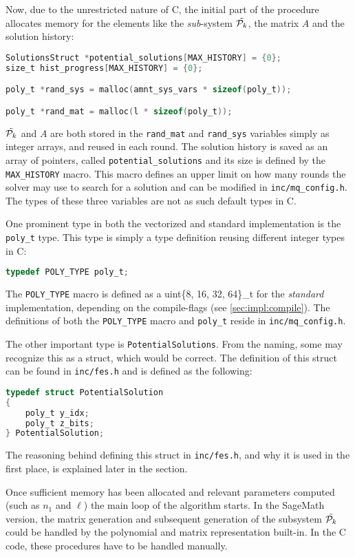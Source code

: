 Now, due to the unrestricted nature of C, the initial part of the procedure allocates memory for the elements like the \textit{sub}-system $\Tilde{\mathcal{P}_k}$, the matrix $A$ and the solution history:
\begin{lstlisting}[language=C,style=mystyle]
SolutionsStruct *potential_solutions[MAX_HISTORY] = {0};
size_t hist_progress[MAX_HISTORY] = {0};

poly_t *rand_sys = malloc(amnt_sys_vars * sizeof(poly_t));

poly_t *rand_mat = malloc(l * sizeof(poly_t));    
\end{lstlisting}
$\Tilde{\mathcal{P}_k}$ and $A$ are both stored in the \texttt{rand\_mat} and \texttt{rand\_sys} variables simply as integer arrays, and reused in each round. The solution history is saved as an array of pointers, called \texttt{potential\_solutions} and its size is defined by the \texttt{MAX\_HISTORY} macro. This macro defines an upper limit on how many rounds the solver may use to search for a solution and can be modified in \texttt{inc/mq\_config.h}. The types of these three variables are not as such default types in C.

One prominent type in both the vectorized and standard implementation is the \texttt{poly\_t} type. This type is simply a type definition reusing different integer types in C:
\begin{lstlisting}[language=C,style=mystyle]
typedef POLY_TYPE poly_t;
\end{lstlisting}
The \texttt{POLY\_TYPE} macro is defined as a uint\{8, 16, 32, 64\}\_t for the \textit{standard} implementation, depending on the compile-flags (see \cref{sec:impl:compile}). The definitions of both the \texttt{POLY\_TYPE} macro and \texttt{poly\_t} reside in \texttt{inc/mq\_config.h}.

The other important type is \texttt{PotentialSolutions}. From the naming, some may recognize this as a struct, which would be correct. The definition of this struct can be found in \texttt{inc/fes.h} and is defined as the following:
\begin{lstlisting}[language=C,style=mystyle]
typedef struct PotentialSolution
{
    poly_t y_idx;
    poly_t z_bits;
} PotentialSolution;    
\end{lstlisting}
The reasoning behind defining this struct in \texttt{inc/fes.h}, and why it is used in the first place, is explained later in the section.

Once sufficient memory has been allocated and relevant parameters computed (such as $n_1$ and $\ell$) the main loop of the algorithm starts. In the SageMath version, the matrix generation and subsequent generation of the subsystem $\Tilde{\mathcal{P}_k}$ could be handled by the polynomial and matrix representation built-in. In the C code, these procedures have to be handled manually. 

